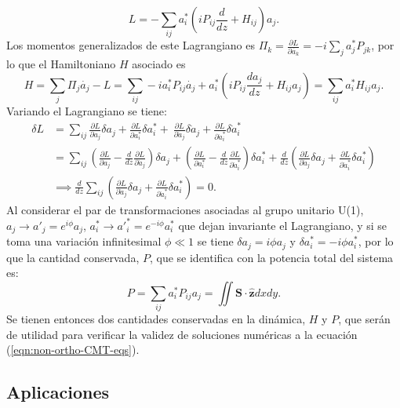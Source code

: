 \begin{equation}
	L = -\sum_{ij}  a_i^*\left(i  P_{ij} \frac{d }{dz} + H_{ij}  \right)a_j.
\end{equation}
Los momentos generalizados de este Lagrangiano es $\Pi_k=\frac{\partial L}{\partial \dot{a_k}} = -i\sum_{j} a_j^* P_{jk}$, por lo que el Hamiltoniano $H$ asociado es
\begin{equation}
H = \sum_{j} \Pi_j \dot{a_j} - L = \sum_{ij} -ia_i^* P_{ij} \dot{a_j} + a_i^*\left(i  P_{ij} \frac{d a_j}{dz} + H_{ij} a_j \right) = \sum_{ij} a_i^* H_{ij} a_j.
\end{equation}
Variando el Lagrangiano se tiene:
\begin{align*}
	\delta L &= \sum_{ij} \frac{\partial L}{\partial a_j} \delta a_{j} +  \frac{\partial L}{\partial {a}_{i}^*} \delta {a}_{i}^* + \ \frac{\partial L}{\partial \dot{a}_{j}} \delta \dot{a}_{j} + \frac{\partial L}{\partial \dot{{a}}_{i}^*} \delta \dot{{a}}_{i}^*
	\\
	&= \sum_{ij} \left( \frac{\partial L}{\partial a_{j}} - \frac{d}{dz}\frac{\partial L}{\partial \dot{a}_{j}} \right)\delta a_{j} + \left( \frac{\partial L}{\partial {a}_{i}^*} - \frac{d}{dz}\frac{\partial L}{\partial  \dot{{a}}_{i}^*} \right)\delta {a}_{i}^* + \frac{d}{dz}\left(\frac{\partial L}{\partial \dot{a}_{j}}\delta a_{j} +  \frac{\partial L}{\partial \dot{{a}}^*_{i}}\delta {a}_{i}^*\right)
	\\	
	&\implies  \frac{d}{dz} \sum_{ij}\left(\frac{\partial L}{\partial \dot{a}_{j}}\delta a_{j} +  \frac{\partial L}{\partial \dot{{a}}_{i}^*}\delta {a}_{i}^*\right) = 0.
\end{align*}
Al considerar el par de transformaciones asociadas al grupo unitario U(1), $a_j\to a'_j = e^{i\phi}a_j$, ${a}_i^* \to {a'}_i^* = e^{-i\phi}{a}_i^*$ que dejan invariante el Lagrangiano, y si se toma una variación infinitesimal $\phi \ll 1$ se tiene $\delta a_j = i\phi a_j$ y $\delta {a}_i^* = -i\phi {a}_i^*$, por lo que la cantidad conservada, $P$, que se identifica con la potencia total del sistema es:
\begin{equation}
	P = \sum_{ij} a_i^* P_{ij} a_j = \iint \textbf{S} \cdot \hat{\textbf{z}} dxdy.  \label{eqn:power}
\end{equation}
Se tienen entonces dos cantidades conservadas en la dinámica, $H$ y $P$, que serán de utilidad para verificar la validez de soluciones numéricas a la ecuación (\ref{eqn:non-ortho-CMT-eqs}).

\subsection{Aplicaciones}
